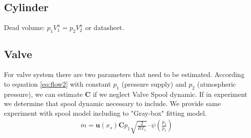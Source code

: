 \subsection{Cylinder}
Dead volume: $p_1 V_1^n = p_2 V_2^n$ or datasheet.

\subsection{Valve}
For valve system there are two parameters that need to be estimated.
According to equation \ref{eq:flow2} with constant $p_1$ (pressure supply) and $p_2$
(atmospheric pressure), we can estimate $\boldsymbol{C}$ if we neglect Valve Spool dynamic.
If in experiment we determine that spool dynamic necessary to include. We
provide same experiment with spool model including to "Gray-box" fitting
model.
\begin{align}
    \dot{m} = \boldsymbol{u}(x_s) \boldsymbol{C}  p_1 \sqrt{\frac{2}{RT_1}}
    \cdot \psi\left(\frac{p_2}{p_1}\right)
    \label{eq:flow2}
\end{align}



